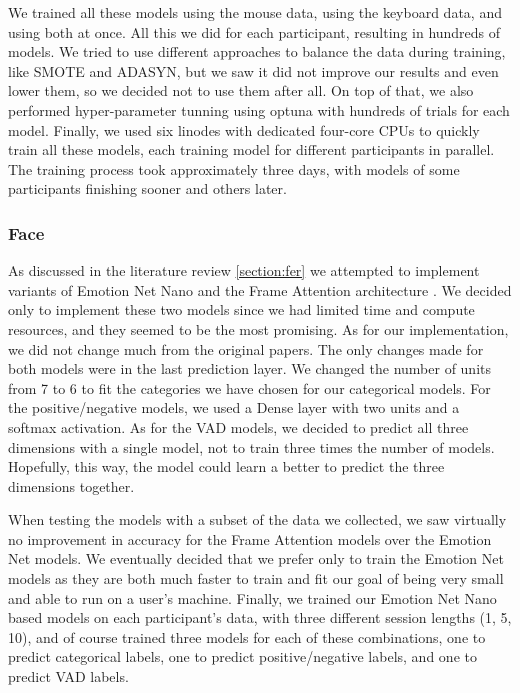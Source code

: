     We trained all these models using the mouse data, using the keyboard data, 
    and using both at once. All this we did for each participant, resulting in hundreds of models. We tried to use different approaches to balance 
    the data during training, like SMOTE and ADASYN, but we saw it did not improve our results and even lower them, so we decided not to use them after all.
    On top of that, we also performed hyper-parameter tunning using optuna \cite{optuna} with hundreds of trials for each model. 
    Finally, we used six linodes with dedicated four-core CPUs to quickly train all these models, each training model for different 
    participants in parallel. The training process took approximately three days, with models of some participants finishing sooner and others later.



    \subsubsection{Face}

    As discussed in the literature review \ref{section:fer} we attempted to implement variants of Emotion Net Nano
    \cite{emotionnet-nano} and the Frame Attention architecture \cite{fan}. 
    We decided only to implement these two models since we had limited time and compute resources, 
    and they seemed to be the most promising. As for our implementation, we did not change much from the original papers. 
    The only changes made for both models were in the last prediction layer. We changed the number of units from 7 to 6 to 
    fit the categories we have chosen for our categorical models. For the positive/negative models, we used a Dense layer with 
    two units and a softmax activation. As for the VAD models, we decided to predict all three dimensions with a single model, 
    not to train three times the number of models. Hopefully, this way, the model could learn a better to predict the three dimensions together.

    When testing the models with a subset of the data we collected,
    we saw virtually no improvement in accuracy for the Frame Attention models over the Emotion Net models. We eventually 
    decided that we prefer only to train the Emotion Net models as they are both much faster to train and fit our goal of being very 
    small and able to run on a user's machine. Finally, we trained our Emotion Net Nano based models on each participant's data, 
    with three different session lengths (1, 5, 10), and of course trained three models for each of these combinations, 
    one to predict categorical labels, one to predict positive/negative labels, and one to predict VAD labels. 

